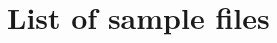 \documentclass{article}
\begin{document}
\begin{comment}
\paragraph*{Executing these scripts.} To begin with, I'm no expert. \verb~:-{)~
\begin{itemize}
    \item \textbf{Windows PowerShell scripts.} You must grant the
        permissions for the scripts to executed: open PowerShell (run as
        administrator)1, paste \texttt{Set-ExecutionPolicy RemoteSigned} at
        the prompt and execute this line.
    \item[] The easiest way of working with PowerShell is through the Windows
        PowerShell ISE app. Press the Search icon in the lower left corner of
        windows and type in PowerShell and amongst the matches presented is
        Windows PowerShell ISE. To executed one of the scripts, use the
        File menu to open \texttt{getquizzes.ps1}, for example. There you can edit
        and save the script in the editor provided. To run the script, press the Run Script (F5)
        on the toolbar.
    \item \textbf{Linux bash scripts} On Linux there are permissions to be granted as well, I refer
    the interested reader to \href{https://ryanstutorials.net/bash-scripting-tutorial/bash-script.php}{this web page}.\footnote
    {\url{https://ryanstutorials.net/bash-scripting-tutorial/bash-script.php}} This web page is just one of many
    found by a Google search.
\end{itemize}
\end{comment}

\section{List of sample files}
\end{document}
